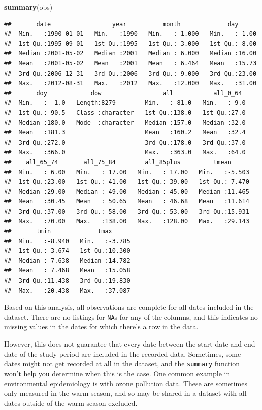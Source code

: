 \documentclass[
]{book}
\newenvironment{Shaded}{\begin{snugshade}}{\end{snugshade}}
\newcommand{\KeywordTok}[1]{\textcolor[rgb]{0.13,0.29,0.53}{\textbf{#1}}}
\newcommand{\NormalTok}[1]{#1}
\begin{document}
\begin{Shaded}
\begin{Highlighting}[]
\KeywordTok{summary}\NormalTok{(obs)}
\end{Highlighting}
\end{Shaded}

\begin{verbatim}
##       date                 year          month             day       
##  Min.   :1990-01-01   Min.   :1990   Min.   : 1.000   Min.   : 1.00  
##  1st Qu.:1995-09-01   1st Qu.:1995   1st Qu.: 3.000   1st Qu.: 8.00  
##  Median :2001-05-02   Median :2001   Median : 6.000   Median :16.00  
##  Mean   :2001-05-02   Mean   :2001   Mean   : 6.464   Mean   :15.73  
##  3rd Qu.:2006-12-31   3rd Qu.:2006   3rd Qu.: 9.000   3rd Qu.:23.00  
##  Max.   :2012-08-31   Max.   :2012   Max.   :12.000   Max.   :31.00  
##       doy            dow                 all           all_0_64   
##  Min.   :  1.0   Length:8279        Min.   : 81.0   Min.   : 9.0  
##  1st Qu.: 90.5   Class :character   1st Qu.:138.0   1st Qu.:27.0  
##  Median :180.0   Mode  :character   Median :157.0   Median :32.0  
##  Mean   :181.3                      Mean   :160.2   Mean   :32.4  
##  3rd Qu.:272.0                      3rd Qu.:178.0   3rd Qu.:37.0  
##  Max.   :366.0                      Max.   :363.0   Max.   :64.0  
##    all_65_74       all_75_84        all_85plus         tmean       
##  Min.   : 6.00   Min.   : 17.00   Min.   : 17.00   Min.   :-5.503  
##  1st Qu.:23.00   1st Qu.: 41.00   1st Qu.: 39.00   1st Qu.: 7.470  
##  Median :29.00   Median : 49.00   Median : 45.00   Median :11.465  
##  Mean   :30.45   Mean   : 50.65   Mean   : 46.68   Mean   :11.614  
##  3rd Qu.:37.00   3rd Qu.: 58.00   3rd Qu.: 53.00   3rd Qu.:15.931  
##  Max.   :70.00   Max.   :138.00   Max.   :128.00   Max.   :29.143  
##       tmin             tmax       
##  Min.   :-8.940   Min.   :-3.785  
##  1st Qu.: 3.674   1st Qu.:10.300  
##  Median : 7.638   Median :14.782  
##  Mean   : 7.468   Mean   :15.058  
##  3rd Qu.:11.438   3rd Qu.:19.830  
##  Max.   :20.438   Max.   :37.087
\end{verbatim}

Based on this analysis, all observations are complete for all dates included
in the dataset. There are no listings for \texttt{NA}s for any of the columns, and
this indicates no missing values in the dates for which there's a row in the data.

However, this does not guarantee that every date between the start date and
end date of the study period are included in the recorded data. Sometimes,
some dates might not get recorded at all in the dataset, and the \texttt{summary}
function won't help you determine when this is the case. One common example in
environmental epidemiology is with ozone pollution data. These are sometimes
only measured in the warm season, and so may be shared in a dataset with all
dates outside of the warm season excluded.
\end{document}
